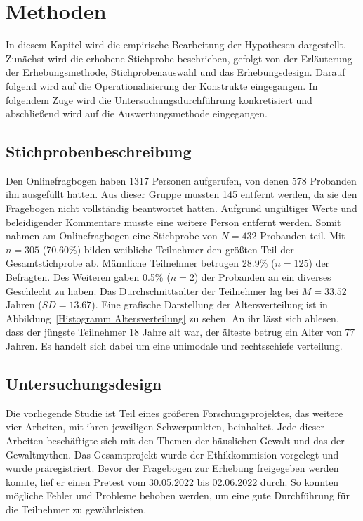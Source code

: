 \chapter{Methoden}   \label{ch_3}
In diesem Kapitel wird die empirische Bearbeitung der Hypothesen dargestellt. Zunächst wird die erhobene Stichprobe beschrieben, gefolgt von der Erläuterung der Erhebungsmethode, Stichprobenauswahl und das Erhebungsdesign. Darauf folgend wird auf die Operationalisierung der Konstrukte eingegangen. In folgendem Zuge wird die Untersuchungsdurchführung konkretisiert und abschließend wird auf die Auswertungsmethode eingegangen.

\section{Stichprobenbeschreibung} \label{sec_3.1}
Den Onlinefragbogen haben 1317 Personen aufgerufen, von denen 578 Probanden ihn ausgefüllt hatten. Aus dieser Gruppe mussten 145 entfernt werden, da sie den Fragebogen nicht vollständig beantwortet hatten. Aufgrund ungültiger Werte und beleidigender Kommentare musste eine weitere Person entfernt werden. Somit nahmen am Onlinefragbogen eine Stichprobe von $N = 432$ Probanden teil. 
Mit $n = 305$ (70.60\%) bilden weibliche Teilnehmer den größten Teil der Gesamtstichprobe ab. Männliche Teilnehmer betrugen 28.9\% ($n = 125$) der Befragten. Des Weiteren gaben 0.5\% ($n = 2$) der Probanden an ein diverses Geschlecht zu haben. Das Durchschnittsalter der Teilnehmer lag bei $M = 33.52$ Jahren ($SD = 13.67$). Eine grafische Darstellung der Altersverteilung ist in Abbildung~\ref{Histogramm Altersverteilung} zu sehen. An ihr lässt sich ablesen, dass der jüngste Teilnehmer 18 Jahre alt war, der älteste betrug ein Alter von 77 Jahren. Es handelt sich dabei um eine unimodale und rechtsschiefe verteilung. 



\section{Untersuchungsdesign}  \label{sec_3.2}
Die vorliegende Studie ist Teil eines größeren Forschungsprojektes, das weitere vier Arbeiten, mit ihren jeweiligen Schwerpunkten, beinhaltet. Jede dieser Arbeiten beschäftigte sich mit den Themen der häuslichen Gewalt und das der Gewaltmythen. Das Gesamtprojekt wurde der Ethikkommision vorgelegt und wurde präregistriert. Bevor der Fragebogen zur Erhebung freigegeben werden konnte, lief er einen Pretest vom 30.05.2022 bis 02.06.2022 durch. So konnten mögliche Fehler und Probleme behoben werden, um eine gute Durchführung für die Teilnehmer zu gewährleisten.

